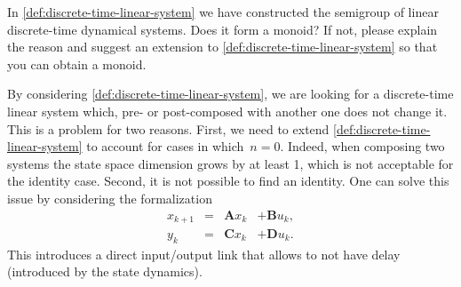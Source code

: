 \begin{exercise}
	In \cref{def:discrete-time-linear-system} we have constructed the semigroup of linear discrete-time dynamical systems.
	Does it form a monoid?
	If not, please explain the reason and suggest an extension to \cref{def:discrete-time-linear-system} so that you can obtain a monoid.
\end{exercise}
\begin{solution}
	By considering \cref{def:discrete-time-linear-system}, we are looking for a discrete-time linear system which, pre- or post-composed with another one does not change it.
	This is a problem for two reasons.
	First, we need to extend \cref{def:discrete-time-linear-system} to account for cases in which~$n=0$.
	Indeed, when composing two systems the state space dimension grows by at least 1, which is not acceptable for the identity case.
	Second, it is not possible to find an identity.
	One can solve this issue by considering the formalization
	\begin{equation}
		\label{eq:discrete-time-dynamics-D}
		\begin{aligned}
			x_{k+1} & = & \mathbf{A} x_k & + \mathbf{B} u_k, \\
			y_{k}   & = & \mathbf{C} x_k & + \mathbf{D} u_k.
		\end{aligned}
	\end{equation}
	This introduces a direct input/output link that allows to not have delay (introduced by the state dynamics).
\end{solution}
